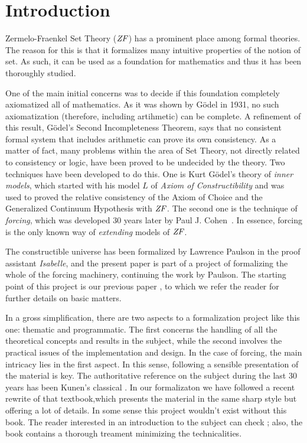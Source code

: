 \section{Introduction}
Zermelo-Fraenkel Set Theory ($\mathit{ZF}$) has a prominent place among formal
theories. The reason for this is that it formalizes many intuitive
properties of the notion of set. As such, it can be used as a
foundation for mathematics and thus it has been
thoroughly studied. 

One of the main initial concerns was to decide if this foundation
completely axiomatized all of mathematics. As it was shown by G\"odel
in 1931, no  such axiomatization (therefore, including artihmetic) can
be complete. A refinement of this result, G\"odel's Second
Incompleteness Theorem, says that no consistent formal system that
includes arithmetic can prove its own consistency. As a matter of
fact, many problems within the area of Set Theory, not directly related
to consistency or logic, have been proved to be undecided by the
theory. Two techniques have been developed to do this. One is Kurt G\"odel's
theory of \emph{inner models}, which started with his model $L$ of
\emph{Axiom of Constructibility} \cite{godel-L} and was used to proved the relative
consistency of the Axiom of Choice and the Generalized Continuum
Hypothesis with $\mathit{ZF}$. The second one is the technique of
\emph{forcing}, which was developed 30 years later by Paul
J. Cohen~\cite{Cohen-CH-PNAS}. In essence, forcing is the only known
way of \emph{extending} models of $\mathit{ZF}$. 

The constructible universe  has been formalized by Lawrence
Paulson \cite{paulson_2003} in the proof assistant \emph{Isabelle}, and
the present paper is part of a project of formalizing the whole of the
forcing machinery, continuing the work by Paulson. The starting point
of this project is our previous paper 
\cite{2018arXiv180705174G}, to which we 
refer the reader for further details on basic matters. 


In a gross simplification, there are two aspects to a formalization
project like this one: thematic and programmatic. The first concerns
the handling of all the theoretical concepts and results in the
subject, while the second involves the practical issues of the
implementation and design. In the case of forcing, the main intricacy
lies in the first aspect. In this sense, following a sensible
presentation of the material is key.  The authoritative reference 
on the subject during the last 30 years has been Kunen's classical
\cite{kunen1980}. In our
formalizaton we have followed a recent rewrite \cite{kunen2011set}
of that  textbook,which presents the material in the same sharp 
style but offering a lot of details. In some sense this project
wouldn't exist without this book. The reader interested in an
introduction to the subject can check
\cite{chow-beginner-forcing}; also, the book \cite{weaver2014forcing}
contains a thorough treament minimizing the technicalities.


